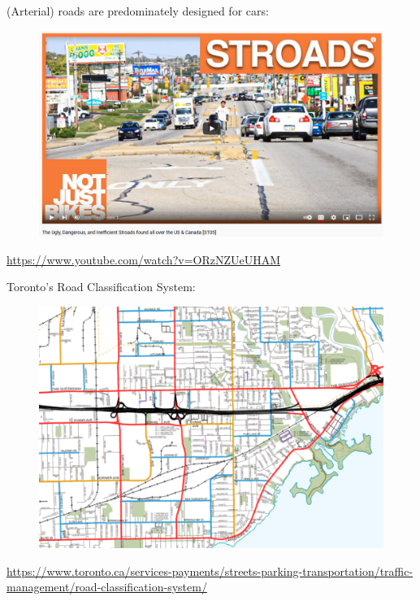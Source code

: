 \documentclass[aspectratio=169]{beamer}
\begin{document}
\begin{frame}
	
	(Arterial) roads are predominately designed for cars:
	
	\begin{figure}
		\centering
		\includegraphics[width=0.85\linewidth]{images/stroads.png}
		
	\end{figure}
	\tiny{\url{https://www.youtube.com/watch?v=ORzNZUeUHAM}}
	
\end{frame}



\begin{frame}
	
	Toronto's Road Classification System:
	
	\begin{figure}
		\centering
		\includegraphics[width=0.75\linewidth]{images/tor_road_heir.png}
		
	\end{figure}
	\tiny{\url{https://www.toronto.ca/services-payments/streets-parking-transportation/traffic-management/road-classification-system/}}
	
\end{frame}
\end{document}
